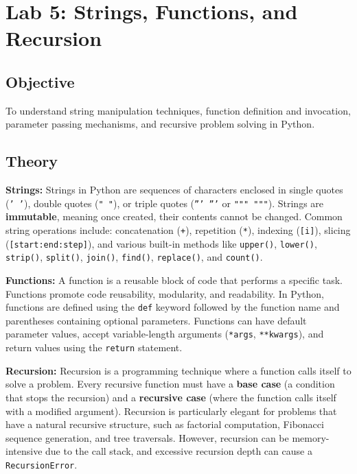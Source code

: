 \documentclass[12pt,a4paper]{article}
\begin{document}
\newpage

\section{Lab 5: Strings, Functions, and Recursion}

\subsection{Objective}
To understand string manipulation techniques, function definition and invocation, parameter passing mechanisms, and recursive problem solving in Python.

\subsection{Theory}

\textbf{Strings:}
Strings in Python are sequences of characters enclosed in single quotes (\texttt{' '}), double quotes (\texttt{" "}), or triple quotes (\texttt{''' '''} or \texttt{""" """}). Strings are \textbf{immutable}, meaning once created, their contents cannot be changed. Common string operations include: concatenation (\texttt{+}), repetition (\texttt{*}), indexing (\texttt{[i]}), slicing (\texttt{[start:end:step]}), and various built-in methods like \texttt{upper()}, \texttt{lower()}, \texttt{strip()}, \texttt{split()}, \texttt{join()}, \texttt{find()}, \texttt{replace()}, and \texttt{count()}.

\textbf{Functions:}
A function is a reusable block of code that performs a specific task. Functions promote code reusability, modularity, and readability. In Python, functions are defined using the \texttt{def} keyword followed by the function name and parentheses containing optional parameters. Functions can have default parameter values, accept variable-length arguments (\texttt{*args}, \texttt{**kwargs}), and return values using the \texttt{return} statement.

\textbf{Recursion:}
Recursion is a programming technique where a function calls itself to solve a problem. Every recursive function must have a \textbf{base case} (a condition that stops the recursion) and a \textbf{recursive case} (where the function calls itself with a modified argument). Recursion is particularly elegant for problems that have a natural recursive structure, such as factorial computation, Fibonacci sequence generation, and tree traversals. However, recursion can be memory-intensive due to the call stack, and excessive recursion depth can cause a \texttt{RecursionError}.
\end{document}
